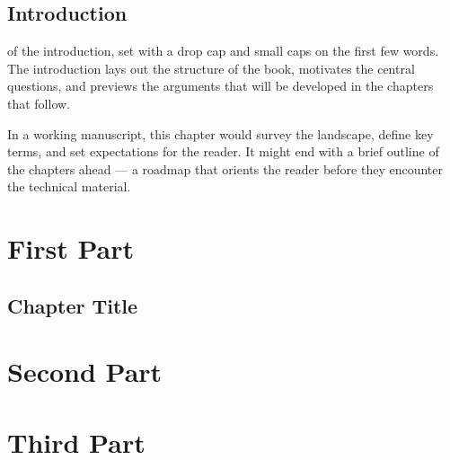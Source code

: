 \documentclass[11pt,twoside,b5paper]{book}
\begin{document}
\chapter{Introduction}
of the introduction, set with a drop cap and small caps on the first few words. The introduction lays out the structure of the book, motivates the central questions, and previews the arguments that will be developed in the chapters that follow.

In a working manuscript, this chapter would survey the landscape, define key terms, and set expectations for the reader. It might end with a brief outline of the chapters ahead --- a roadmap that orients the reader before they encounter the technical material.


\part{First Part}

\chapter{Chapter Title}



\part{Second Part}


\part{Third Part}


\backmatter




\end{document}
